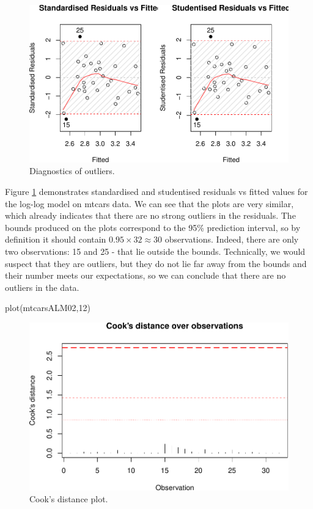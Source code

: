\documentclass[
]{book}
\newenvironment{Shaded}{\begin{snugshade}}{\end{snugshade}}
\newcommand{\DecValTok}[1]{\textcolor[rgb]{0.00,0.00,0.81}{#1}}
\newcommand{\FunctionTok}[1]{\textcolor[rgb]{0.00,0.00,0.00}{#1}}
\newcommand{\NormalTok}[1]{#1}
\theoremstyle{definition}
\theoremstyle{definition}
\theoremstyle{definition}
\theoremstyle{definition}
\theoremstyle{remark}
\begin{document}
\begin{figure}
\centering
\includegraphics{Svetunkov---Statistics-for-Business-Analytics_files/figure-latex/diagnostics05-1.pdf}
\caption{\label{fig:diagnostics05}Diagnostics of outliers.}
\end{figure}

Figure \ref{fig:diagnostics05} demonstrates standardised and studentised residuals vs fitted values for the log-log model on mtcars data. We can see that the plots are very similar, which already indicates that there are no strong outliers in the residuals. The bounds produced on the plots correspond to the 95\% prediction interval, so by definition it should contain \(0.95\times 32 \approx 30\) observations. Indeed, there are only two observations: 15 and 25 - that lie outside the bounds. Technically, we would suspect that they are outliers, but they do not lie far away from the bounds and their number meets our expectations, so we can conclude that there are no outliers in the data.

\begin{Shaded}
\begin{Highlighting}[]
\FunctionTok{plot}\NormalTok{(mtcarsALM02,}\DecValTok{12}\NormalTok{)}
\end{Highlighting}
\end{Shaded}

\begin{figure}
\centering
\includegraphics{Svetunkov---Statistics-for-Business-Analytics_files/figure-latex/diagnostics06-1.pdf}
\caption{\label{fig:diagnostics06}Cook's distance plot.}
\end{figure}
\end{document}
